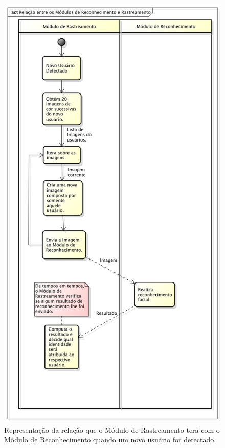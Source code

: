 		\begin{figure}[htb]
			\begin{center}
				\includegraphics[scale=0.5]{figuras/4.ProblemaEProposta/diagrama-relacao.png}
			\end{center}
			\caption{Representação da relação que o Módulo de Rastreamento terá com o Módulo de Reconhecimento quando um novo usuário for detectado.}
			\label{fig:rastreamento-reconhecimento}
		\end{figure}
	
